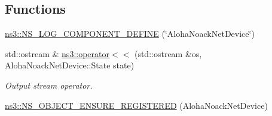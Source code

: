 \subsection*{Functions}
\begin{DoxyCompactItemize}
\item 
\hyperlink{namespacens3_a5ede09697b5d61dad500a361383b3303}{ns3\+::\+N\+S\+\_\+\+L\+O\+G\+\_\+\+C\+O\+M\+P\+O\+N\+E\+N\+T\+\_\+\+D\+E\+F\+I\+NE} (\char`\"{}Aloha\+Noack\+Net\+Device\char`\"{})
\item 
std\+::ostream \& \hyperlink{namespacens3_a51520cb61bbe32f4aeaa18b0b895915b}{ns3\+::operator$<$$<$} (std\+::ostream \&os, Aloha\+Noack\+Net\+Device\+::\+State state)
\begin{DoxyCompactList}\small\item\em Output stream operator. \end{DoxyCompactList}\item 
\hyperlink{namespacens3_ad8985b9b8d97a3aff22dec57a8562629}{ns3\+::\+N\+S\+\_\+\+O\+B\+J\+E\+C\+T\+\_\+\+E\+N\+S\+U\+R\+E\+\_\+\+R\+E\+G\+I\+S\+T\+E\+R\+ED} (Aloha\+Noack\+Net\+Device)
\end{DoxyCompactItemize}
